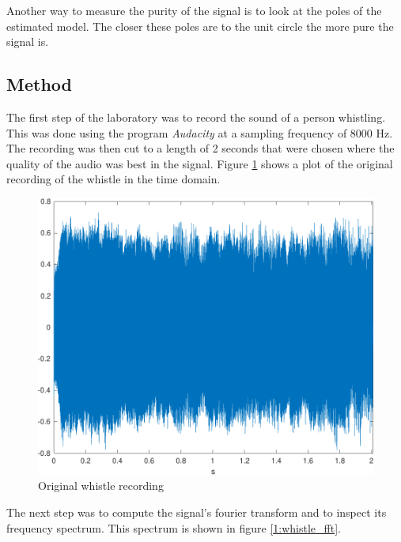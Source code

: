 \documentclass{IEEEtran}
\begin{document}
Another way to measure the purity of the signal is to look at the poles
of the estimated model. The closer these poles are to the unit circle
the more pure the signal is.

\subsection{Method}
\label{sub:whistlemethod}
The first step of the laboratory was to record the sound of a person
whistling. This was done using the program \textit{Audacity}
\cite{audacity} at a sampling frequency of 8000 Hz. The recording was then
cut to a length of 2 seconds that were chosen where the quality of the
audio was best in the signal. Figure \ref{1:whistle_orig} shows a plot
of the original recording of the whistle in the time domain.

\begin{figure}[h]
  \centering
  \captionsetup{justification=centering}

  \includegraphics[width=0.8\columnwidth]{pictures/whistle_orig.pdf}
  \caption{Original whistle recording}
  \label{1:whistle_orig}

\end{figure}

The next step was to compute the signal's fourier transform and to
inspect its frequency spectrum. This spectrum is shown in figure
\ref{1:whistle_fft}.
\end{document}
